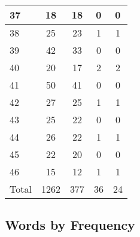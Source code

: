 \begin{center}
\begin{longtable}{l|c|c|c|c}
37 & 18 & 18 & 0 & 0\\ \hline
38 & 25 & 23 & 1 & 1\\ \hline
39 & 42 & 33 & 0 & 0\\ \hline
40 & 20 & 17 & 2 & 2\\ \hline
41 & 50 & 41 & 0 & 0\\ \hline
42 & 27 & 25 & 1 & 1\\ \hline
43 & 25 & 22 & 0 & 0\\ \hline
44 & 26 & 22 & 1 & 1\\ \hline
45 & 22 & 20 & 0 & 0\\ \hline
46 & 15 & 12 & 1 & 1\\ \hline
\hline \hline
Total & 1262 & 377 & 36 & 24



\end{longtable}
\end{center}

 
\subsection{Words by Frequency}

